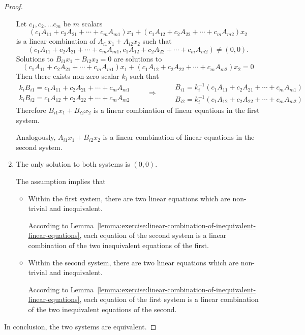 \begin{proof}
\begin{enumerate}[label = \textbf{Case \arabic*.}, itemindent=1cm]
		      Let $c_{1}, c_{2}, \ldots c_{m}$ be $m$ scalars
		      \[
			      (c_{1}A_{11} + c_{2}A_{21} + \cdots + c_{m}A_{m1})x_{1} + (c_{1}A_{12} + c_{2}A_{22} + \cdots + c_{m}A_{m2})x_{2}
		      \]
		      is a linear combination of $A_{i1}x_{1} + A_{i2}x_{2}$ such that
		      \[
			      (c_{1}A_{11} + c_{2}A_{21} + \cdots + c_{m}A_{m1}, c_{1}A_{12} + c_{2}A_{22} + \cdots + c_{m}A_{m2})\ne (0, 0).
		      \]
		      Solutions to $B_{i1}x_{1} + B_{i2}x_{2} = 0$ are solutions to
		      \[
			      (c_{1}A_{11} + c_{2}A_{21} + \cdots + c_{m}A_{m1})x_{1} + (c_{1}A_{12} + c_{2}A_{22} + \cdots + c_{m}A_{m2})x_{2} = 0
		      \]
		      Then there exists non-zero scalar $k_{i}$ such that
		      \[
			      \begin{split}
				      k_{i}B_{i1} = c_{1}A_{11} + c_{2}A_{21} + \cdots + c_{m}A_{m1} \\
				      k_{i}B_{i2} = c_{1}A_{12} + c_{2}A_{22} + \cdots + c_{m}A_{m2}
			      \end{split}
			      \qquad\Longrightarrow\qquad
			      \begin{split}
				      B_{i1} = k_{i}^{-1}\left(c_{1}A_{11} + c_{2}A_{21} + \cdots + c_{m}A_{m1}\right) \\
				      B_{i2} = k_{i}^{-1}\left(c_{1}A_{12} + c_{2}A_{22} + \cdots + c_{m}A_{m2}\right)
			      \end{split}
		      \]
		      Therefore $B_{i1}x_{1} + B_{i2}x_{2}$ is a linear combination of linear equations in the first system.

		      Analogously, $A_{i1}x_{1} + B_{i2}x_{2}$ is a linear combination of linear equations in the second system.

		\item The only solution to both systems is $(0, 0)$.

		      The assumption implies that
		      \begin{itemize}
			      \item Within the first system, there are two linear equations which are non-trivial and inequivalent.

			            According to Lemma~\ref{lemma:exercise:linear-combination-of-inequivalent-linear-equations}, each equation of the second system is a linear combination of the two inequivalent equations of the first.
			      \item Within the second system, there are two linear equations which are non-trivial and inequivalent.

			            According to Lemma~\ref{lemma:exercise:linear-combination-of-inequivalent-linear-equations}, each equation of the first system is a linear combination of the two inequivalent equations of the second.
		      \end{itemize}
	\end{enumerate}

	In conclusion, the two systems are equivalent.
\end{proof}

